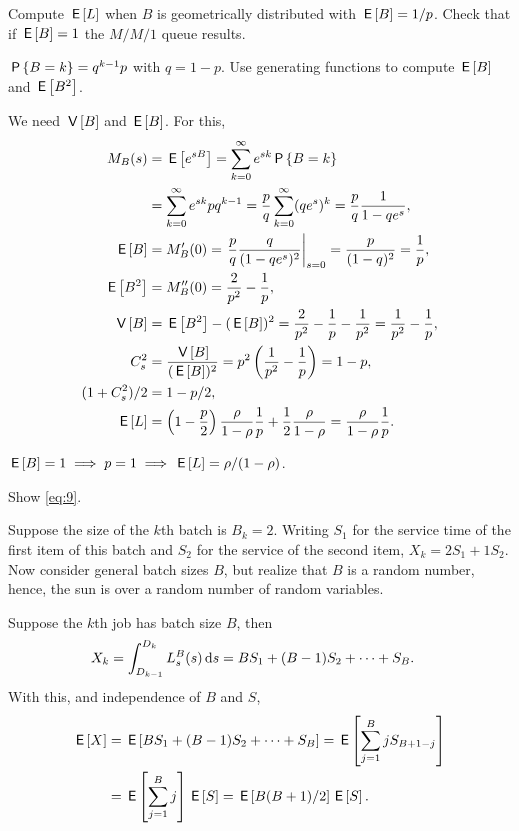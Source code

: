 \begin{exercise}\label{ex:l-168}
Compute $\E\L$ when $B$ is geometrically distributed with $\E B =  1/p$. Check that if $\E B =1$ the $M/M/1$ queue results.
\begin{hint}
$\P{B=k}=q^{k-1}p$ with $q=1-p$. Use generating functions to compute $\E B$ and $\E{B^2}$.
\end{hint}
\begin{solution}
 We need $\V B$ and $\E B$. For this, 
 \begin{align*}
 M_B(s) 
&= \E{e^{sB}} = \sum_{k=0}^\infty e^{sk} \P{B=k} \\
&= \sum_{k=0}^\infty e^{sk} p q^{k-1} 
= \frac p q \sum_{k=0}^\infty (q e^s)^k = \frac p q \frac1{1-qe^s},\\
 \E B &= M_B'(0) = \left.\frac p q \frac q{(1-q e^s)^2}\right|_{s=0}= \frac p{(1-q)^2} = \frac 1 p,\\
 \E{B^2} &= M_B''(0) = \frac2{p^2} - \frac1p, \\
 \V B &= \E{B^2} - (\E B)^2 = \frac2{p^2} - \frac1p - \frac1{p^2} = \frac1{p^2}-\frac1p,\\
 C_s^2&= \frac{\V B}{(\E B)^2} = p^2 \left(\frac1{p^2}-\frac1p\right)=1-p,\\
 (1+C_s^2)/2 &= 1-p/2,\\
 \E \L &= 
\left(1-\frac p2\right) \frac\rho{1-\rho} \frac 1 p + \frac12\frac\rho{1-\rho}
=\frac\rho{1-\rho} \frac 1 p.
\end{align*}

$\E B = 1 \implies p = 1 \implies \E\L=\rho/(1-\rho)$.
\end{solution}
\end{exercise}


\begin{exercise}\label{ex:99}
Show
\cref{eq:9}.
\begin{hint}
  Suppose the size of the $k$th batch is $B_k = 2$.
  Writing $S_1$ for the service time of the first item of this batch and $S_2$ for the service of the second item,  $X_k = 2 S_1 + 1 S_2$.
  Now consider general batch sizes $B$, but realize that $B$ is a random number, hence, the sun is  over a random number of random variables.
\end{hint}
\begin{solution}
 Suppose the $k$th job has batch size $B$, then
  \begin{align*}
    X_k &= \int_{D_{k-1}}^{D_k} \Ls^B(s) \d s 
    = B S_1 + (B-1)S_2 + \cdots + S_B.
  \end{align*}
  With this, and independence of $B$ and $S$, 
  \begin{align*}
    \E X & = \E{B S_1 + (B-1)S_2 + \cdots+ S_B} = \E{\sum_{j=1}^B j S_{B+1-j}} \\
    &= \E{\sum_{j=1}^B j} \E S = \E{B(B+1)/2} \E S.
  \end{align*}
\end{solution}
\end{exercise}


